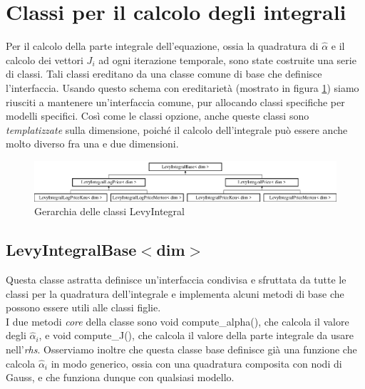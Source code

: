 \documentclass[a4paper,10pt]{report}
\theoremstyle{plain}
\theoremstyle{definition}
\theoremstyle{remark}
\begin{document}
\section{Classi per il calcolo degli integrali}
Per il calcolo della parte integrale dell'equazione, ossia la quadratura di $\hat{\alpha}$ e il calcolo dei vettori $J_i$ ad ogni iterazione temporale, sono state costruite una serie di classi. Tali classi ereditano da una classe comune di base che definisce l'interfaccia. Usando questo schema con ereditarietà (mostrato in figura \ref{fig:levybase}) siamo riusciti a mantenere un'interfaccia comune, pur allocando classi specifiche per modelli specifici. Cos\`i come le classi opzione, anche queste classi sono \emph{templatizzate} sulla dimensione, poiché il calcolo dell'integrale può essere anche molto diverso fra una e due dimensioni.
\begin{figure}[h!]
\begin{center}
\includegraphics[width=12cm]{img/classLevyIntegralBase.eps}
\caption{Gerarchia delle classi LevyIntegral}
\label{fig:levybase}
\end{center}
\end{figure}
\subsection{\textsf{LevyIntegralBase$<$dim$>$}}
Questa classe astratta definisce un'interfaccia condivisa e sfruttata da tutte le classi per la quadratura dell'integrale e implementa alcuni metodi di base che possono essere utili alle classi figlie.\\
I due metodi \emph{core} della classe sono \textsf{void compute\_alpha()}, che calcola il valore degli $\hat{\alpha}_i$, e \textsf{void compute\_J()}, che calcola il valore della parte integrale da usare nell'\emph{rhs}. Osserviamo inoltre che questa classe base definisce già una funzione che calcola $\hat{\alpha}_i$ in modo generico, ossia con una quadratura composita con nodi di Gauss, e che funziona dunque con qualsiasi modello.
\end{document}
